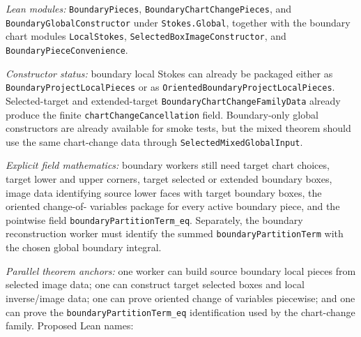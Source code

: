 \begin{definition}
  \label{anc:m6_4_boundary_pieces_chart_change_fields}
  \leanok
  \emph{Lean modules:}
  \texttt{BoundaryPieces}, \texttt{BoundaryChartChangePieces}, and
  \texttt{BoundaryGlobalConstructor} under \texttt{Stokes.Global}, together
  with the boundary chart modules \texttt{LocalStokes},
  \texttt{SelectedBoxImageConstructor}, and \texttt{BoundaryPieceConvenience}.

  \emph{Constructor status:}
  boundary local Stokes can already be packaged either as
  \texttt{BoundaryProjectLocalPieces} or as
  \texttt{OrientedBoundaryProjectLocalPieces}.  Selected-target and
  extended-target \texttt{BoundaryChartChangeFamilyData} already produce the
  finite \texttt{chartChangeCancellation} field.  Boundary-only global
  constructors are already available for smoke tests, but the mixed theorem
  should use the same chart-change data through \texttt{SelectedMixedGlobalInput}.

  \emph{Explicit field mathematics:}
  boundary workers still need target chart choices, target lower and upper
  corners, target selected or extended boundary boxes, image data identifying
  source lower faces with target boundary boxes, the oriented change-of-
  variables package for every active boundary piece, and the pointwise field
  \texttt{boundaryPartitionTerm\_eq}.  Separately, the boundary reconstruction
  worker must identify the summed \texttt{boundaryPartitionTerm} with the
  chosen global boundary integral.

  \emph{Parallel theorem anchors:}
  one worker can build source boundary local pieces from selected image data;
  one can construct target selected boxes and local inverse/image data; one can
  prove oriented change of variables piecewise; and one can prove the
  \texttt{boundaryPartitionTerm\_eq} identification used by the chart-change
  family.  Proposed Lean names:
\end{definition}

